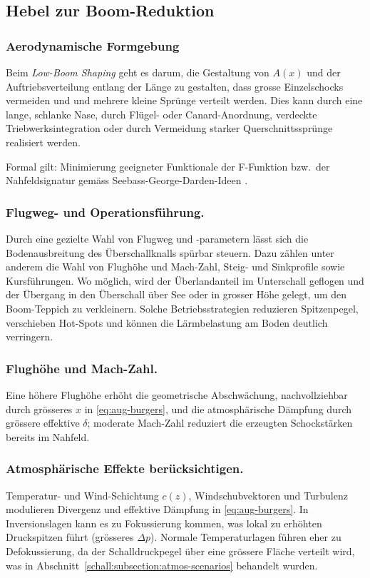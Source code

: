 \subsection{Hebel zur Boom-Reduktion}
\subsubsection{Aerodynamische Formgebung}
Beim \emph{Low-Boom Shaping} geht es darum, die Gestaltung von $A(x)$ und
%
der Auftriebsverteilung entlang der Länge zu gestalten, dass
grosse Einzelschocks vermeiden und und mehrere kleine Sprünge verteilt werden.
Dies kann durch eine lange, schlanke Nase, durch Flügel- oder Canard-Anordnung,
verdeckte Triebwerksintegration oder durch Vermeidung starker
Querschnittssprünge realisiert werden.

Formal gilt: Minimierung geeigneter Funktionale der F-Funktion bzw.~der Nahfeldsignatur
gemäss Seebass-George-Darden-Ideen \cite{schall:seebassgeorge,schall:darden75}.

\subsubsection{Flugweg- und Operationsführung.}
Durch eine gezielte Wahl von Flugweg und -parametern lässt sich die
Bodenausbreitung des Überschallknalls spürbar steuern.
Dazu zählen unter anderem die Wahl von Flughöhe und Mach-Zahl, Steig-
und Sinkprofile sowie Kursführungen.
Wo möglich, wird der Überlandanteil im Unterschall geflogen und der
Übergang in den Überschall über See oder in grosser Höhe gelegt,
um den Boom-Teppich zu verkleinern.
Solche Betriebsstrategien reduzieren Spitzenpegel, verschieben Hot-Spots
und können die Lärmbelastung am Boden deutlich verringern.

\subsubsection{Flughöhe und Mach-Zahl.}
Eine höhere Flughöhe erhöht die geometrische Abschwächung, nachvollziehbar durch
grösseres $x$ in \eqref{eq:aug-burgers}, und die atmosphärische Dämpfung durch
grössere effektive $\delta$; moderate Mach-Zahl reduziert die erzeugten
Schockstärken bereits im Nahfeld.

\subsubsection{Atmosphärische Effekte berücksichtigen.}
Temperatur- und Wind-Schichtung $c(z)$, Windschubvektoren und Turbulenz
modulieren Divergenz und effektive Dämpfung in \eqref{eq:aug-burgers}.
In Inversionslagen kann es zu Fokussierung kommen, was lokal
zu erhöhten Druckspitzen führt (grösseres $\Delta p$).
Normale Temperaturlagen führen eher zu Defokussierung,
da der Schalldruckpegel über eine grössere Fläche verteilt wird,
was in Abschnitt~\ref{schall:subsection:atmos-scenarios} behandelt wurden.

